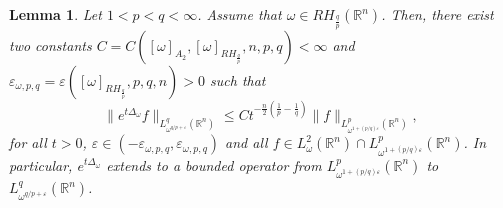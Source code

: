 \documentclass[10pt,a4paper]{amsart}
\newtheorem{lem}{Lemma}
\begin{document}
\begin{lem}\label{lem:HLS}
    Let $1 < p < q<\infty$. Assume that $\omega \in RH_{\frac{q}{p}}(\mathbb{R}^n)$. Then, there exist two constants $C = C([ \omega  ]_{A_2},[ \omega  ]_{RH_{\frac{q}{p}}},n,p,q)<\infty$ and $\varepsilon_{\omega, p,q}=\varepsilon(  [ \omega  ]_{RH_{\frac{q}{p}}},p,q,n)>0$ such that 
    \begin{equation*}
        \| e^{t\Delta_\omega} f \|_{L^q_{{\omega}^{q/p+\varepsilon}}(\mathbb{R}^n)} \leq C t^{-\frac{n}{2}(\frac{1}{p}-\frac{1}{q})} \|  f \|_{L^p_{\omega^{1+(p/q)\varepsilon}}(\mathbb{R}^n)},
        \end{equation*}
    for all $t>0$, $\varepsilon \in (-\varepsilon_{\omega, p,q},\varepsilon_{\omega, p,q})$ and all $f\in L^2_\omega(\mathbb{R}^n) \cap  L^p_{\omega^{1+(p/q)\varepsilon}}(\mathbb{R}^n)$. In particular, 
    $e^{t\Delta_\omega}$ extends to a bounded operator from $L^p_{\omega^{1+(p/q)\varepsilon}}(\mathbb{R}^n)$ to $L^q_{{\omega}^{q/p+\varepsilon}}(\mathbb{R}^n)$.
    \end{lem}
\end{document}
